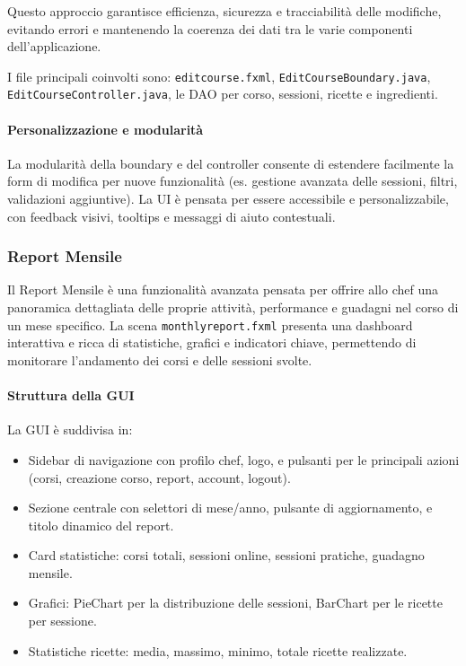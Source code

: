 Questo approccio garantisce efficienza, sicurezza e tracciabilità delle modifiche, evitando errori e mantenendo la coerenza dei dati tra le varie componenti dell'applicazione.

I file principali coinvolti sono: \texttt{editcourse.fxml}, \texttt{EditCourseBoundary.java}, \texttt{EditCourseController.java}, le DAO per corso, sessioni, ricette e ingredienti.

\paragraph{Personalizzazione e modularità}
La modularità della boundary e del controller consente di estendere facilmente la form di modifica per nuove funzionalità (es. gestione avanzata delle sessioni, filtri, validazioni aggiuntive). La UI è pensata per essere accessibile e personalizzabile, con feedback visivi, tooltips e messaggi di aiuto contestuali.

\subsubsection{Report Mensile}
Il Report Mensile è una funzionalità avanzata pensata per offrire allo chef una panoramica dettagliata delle proprie attività, performance e guadagni nel corso di un mese specifico. La scena \texttt{monthlyreport.fxml} presenta una dashboard interattiva e ricca di statistiche, grafici e indicatori chiave, permettendo di monitorare l'andamento dei corsi e delle sessioni svolte.

\paragraph{Struttura della GUI}
La GUI è suddivisa in:
\begin{itemize}
    \item Sidebar di navigazione con profilo chef, logo, e pulsanti per le principali azioni (corsi, creazione corso, report, account, logout).
    \item Sezione centrale con selettori di mese/anno, pulsante di aggiornamento, e titolo dinamico del report.
    \item Card statistiche: corsi totali, sessioni online, sessioni pratiche, guadagno mensile.
    \item Grafici: PieChart per la distribuzione delle sessioni, BarChart per le ricette per sessione.
    \item Statistiche ricette: media, massimo, minimo, totale ricette realizzate.
\end{itemize}

